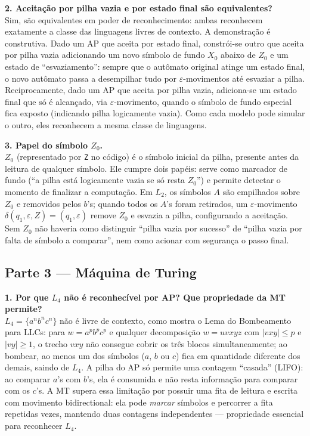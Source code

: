 \documentclass[12pt,a4paper]{article}
\begin{document}
\noindent\textbf{2. Aceitação por pilha vazia e por estado final são equivalentes?}\\
Sim, são equivalentes em poder de reconhecimento: ambas reconhecem exatamente a
classe das linguagens livres de contexto. A demonstração é construtiva. Dado um AP
que aceita por estado final, constrói-se outro que aceita por pilha vazia
adicionando um novo símbolo de fundo $X_0$ abaixo de $Z_0$ e um estado de
``esvaziamento'': sempre que o autômato original atinge um estado final, o novo
autômato passa a desempilhar tudo por $\varepsilon$-movimentos até esvaziar a
pilha. Reciprocamente, dado um AP que aceita por pilha vazia, adiciona-se um
estado final que só é alcançado, via $\varepsilon$-movimento, quando o símbolo de
fundo especial fica exposto (indicando pilha logicamente vazia). Como cada modelo
pode simular o outro, eles reconhecem a mesma classe de linguagens.

\noindent\textbf{3. Papel do símbolo $Z_0$.}\\
$Z_0$ (representado por \texttt{Z} no código) é o símbolo inicial da pilha,
presente antes da leitura de qualquer símbolo. Ele cumpre dois papéis: serve como
marcador de fundo (``a pilha está logicamente vazia se só resta $Z_0$'') e permite
detectar o momento de finalizar a computação. Em $L_2$, os símbolos $A$ são
empilhados sobre $Z_0$ e removidos pelos $b$'s; quando todos os $A$'s foram
retirados, um $\varepsilon$-movimento $\delta(q_1, \varepsilon, Z) = (q_1,
\varepsilon)$ remove $Z_0$ e esvazia a pilha, configurando a aceitação. Sem $Z_0$
não haveria como distinguir ``pilha vazia por sucesso'' de ``pilha vazia por falta
de símbolo a comparar'', nem como acionar com segurança o passo final.

\subsection{Parte 3 --- Máquina de Turing}
\textbf{1. Por que $L_4$ não é reconhecível por AP? Que propriedade da MT permite?}\\
$L_4 = \{a^n b^n c^n\}$ não é livre de contexto, como mostra o Lema do Bombeamento
para LLCs: para $w = a^p b^p c^p$ e qualquer decomposição $w = uvxyz$ com
$|vxy| \leq p$ e $|vy| \geq 1$, o trecho $vxy$ não consegue cobrir os três blocos
simultaneamente; ao bombear, ao menos um dos símbolos ($a$, $b$ ou $c$) fica em
quantidade diferente dos demais, saindo de $L_4$. A pilha do AP só permite uma
contagem ``casada'' (LIFO): ao comparar $a$'s com $b$'s, ela é consumida e não
resta informação para comparar com os $c$'s. A MT supera essa limitação por
possuir uma fita de leitura e escrita com movimento bidirectional: ela pode
\emph{marcar} símbolos e percorrer a fita repetidas vezes, mantendo duas
contagens independentes --- propriedade essencial para reconhecer $L_4$.
\end{document}

